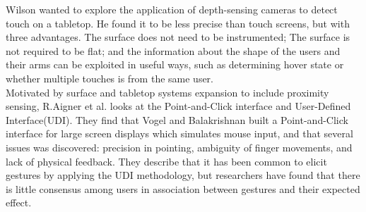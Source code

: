 Wilson \cite{Wilson:2010} wanted to explore the application of depth-sensing cameras to detect touch on a tabletop. He found it to be less precise than touch screens, but with three advantages. The surface does not need to be instrumented; The surface is not required to be flat; and the information about the shape of the users and their arms can be exploited in useful ways, such as determining hover state or whether multiple touches is from the same user. \cite{Wilson:2010}\\


Motivated by surface and tabletop systems expansion to include proximity sensing, R.Aigner et al.\cite{Aigner:2012} looks at the Point-and-Click interface and User-Defined Interface(UDI). They find that Vogel and Balakrishnan \cite{Vogel:2005} built a Point-and-Click interface for large screen displays which simulates mouse input, and that several issues was discovered: precision in pointing, ambiguity of finger movements, and lack of physical feedback. They describe that it has been common to elicit gestures by applying the UDI methodology, but researchers have found that there is little consensus among users in association between gestures and their expected effect.\\


